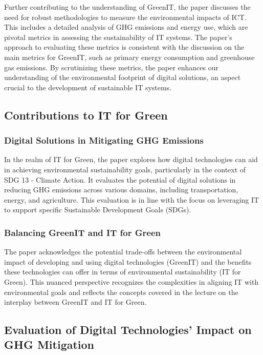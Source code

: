 \documentclass[conference,compsoc]{IEEEtran}
\begin{document}
Further contributing to the understanding of GreenIT, the paper discusses the need for robust methodologies to measure the environmental impacts of ICT. This includes a detailed analysis of GHG emissions and energy use, which are pivotal metrics in assessing the sustainability of IT systems. The paper's approach to evaluating these metrics is consistent with the  discussion on the main metrics for GreenIT, such as primary energy consumption and greenhouse gas emissions. By scrutinizing these metrics, the paper enhances our understanding of the environmental footprint of digital solutions, an aspect crucial to the development of sustainable IT systems.

\subsection{Contributions to IT for Green}

\subsubsection{Digital Solutions in Mitigating GHG Emissions}

In the realm of IT for Green, the paper explores how digital technologies can aid in achieving environmental sustainability goals, particularly in the context of SDG 13 - Climate Action. It evaluates the potential of digital solutions in reducing GHG emissions across various domains, including transportation, energy, and agriculture. This evaluation is in line with the  focus on leveraging IT to support specific Sustainable Development Goals (SDGs).

\subsubsection{Balancing GreenIT and IT for Green}

The paper acknowledges the potential trade-offs between the environmental impact of developing and using digital technologies (GreenIT) and the benefits these technologies can offer in terms of environmental sustainability (IT for Green). This nuanced perspective recognizes the complexities in aligning IT with environmental goals and reflects the concepts covered in the lecture on the interplay between GreenIT and IT for Green.

\subsection{Evaluation of Digital Technologies' Impact on GHG Mitigation}
\end{document}
